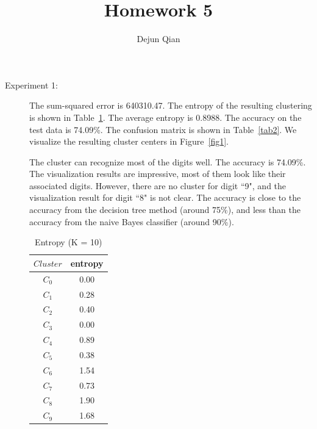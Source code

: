 \documentclass[11pt,letterpaper,oneside]{article}
\title{Homework 5}
\author{Dejun Qian}
\date{}
\begin{document}
\maketitle

\begin{description}

\item[Experiment 1:] The sum-squared error is 640310.47. The entropy of the resulting clustering is shown in Table~\ref{tab1}. The average entropy is 0.8988. The accuracy on the test data is 74.09\%. The confusion matrix is shown in Table~\ref{tab2}. We visualize the resulting cluster centers in Figure~\ref{fig1}.

The cluster can recognize most of the digits well. The accuracy is 74.09\%. The visualization results are impressive, most of them look like their associated digits. However, there are no cluster for digit ``9", and the visualization result for digit ``8" is not clear. The accuracy is close to the accuracy from the decision tree method (around 75\%), and less than the accuracy from the naive Bayes classifier (around 90\%).

\begin{table}[th]
\caption{Entropy (K = 10)}
\centering
\begin{tabular*}{0.2\textwidth}{@{\extracolsep{\fill}}cc}
\hline
$Cluster$ & entropy\\ \hline
$C_0$ & 0.00\\
$C_1$ & 0.28\\
$C_2$ & 0.40\\
$C_3$ & 0.00\\
$C_4$ & 0.89\\
$C_5$ & 0.38\\
$C_6$ & 1.54\\
$C_7$ & 0.73\\
$C_8$ & 1.90\\
$C_9$ & 1.68\\
\hline
\end{tabular*}
\label{tab1}
\end{table}


\end{description}
\end{document}

